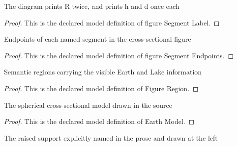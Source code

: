 \begin{definition}
  \label{def:physics:phyx-mini-0726:phyxminiproblems-problemphyxmini0726-figuresegmentlabel}
  The diagram prints R twice, and prints h and d once each
\end{definition}
\begin{proof}
  This is the declared model definition of figure Segment Label.
\end{proof}
\begin{definition}
  \label{def:physics:phyx-mini-0726:phyxminiproblems-problemphyxmini0726-figuresegmentendpoints}
  Endpoints of each named segment in the cross-sectional figure
\end{definition}
\begin{proof}
  This is the declared model definition of figure Segment Endpoints.
\end{proof}
\begin{definition}
  \label{def:physics:phyx-mini-0726:phyxminiproblems-problemphyxmini0726-figureregion}
  Semantic regions carrying the visible Earth and Lake information
\end{definition}
\begin{proof}
  This is the declared model definition of Figure Region.
\end{proof}
\begin{definition}
  \label{def:physics:phyx-mini-0726:phyxminiproblems-problemphyxmini0726-earthmodel}
  The spherical cross-sectional model drawn in the source
\end{definition}
\begin{proof}
  This is the declared model definition of Earth Model.
\end{proof}
\begin{definition}
  \label{def:physics:phyx-mini-0726:phyxminiproblems-problemphyxmini0726-observersupport}
  The raised support explicitly named in the prose and drawn at the left
\end{definition}
